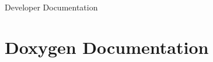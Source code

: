 \documentclass[a4paper, fontsize=10pt, twoside, openright, BCOR1cm]{scrbook}
\newcommand{\clearemptydoublepage}{%
  \newpage{\pagestyle{empty}\cleardoublepage}%
}
\newcommand{\+}{\discretionary{\mbox{\scriptsize$\hookleftarrow$}}{}{}}
\begin{document}
\begin{titlepage}
\vspace*{7cm}
\begin{center}%
{\Large \brickos Developer Documentation}\\
\end{center}
\end{titlepage}
\clearemptydoublepage
{}
\tableofcontents
\clearemptydoublepage
{}
\hypersetup{pageanchor=true}







\chapter{Doxygen Documentation}

\end{document}
